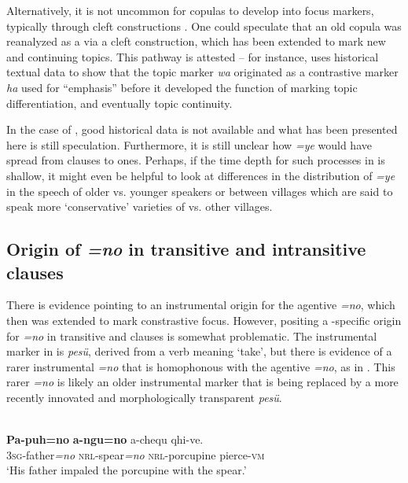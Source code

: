 \documentclass[output=paper]{LSP/langsci}
\begin{document}
Alternatively, it is not uncommon for  copulas to develop into focus markers, typically through cleft constructions  \citep[95]{Heineetal2002World}. 
One could speculate that an old   copula was reanalyzed as a  via a cleft construction, which has been extended to mark new and continuing topics. 
This pathway is attested – for instance, \citet{Ueno1987Functions} uses historical textual data to show that the  topic marker \textit{wa} originated as a contrastive marker \textit{ha} used for “emphasis” before it developed the function of marking topic differentiation, and eventually topic continuity.

In the case of , good historical data is not available and what has been presented here is still speculation. Furthermore, it is still unclear how \textit{=ye} would have spread from  clauses to  ones. Perhaps, if the time depth for such  processes in  is shallow, it might even be helpful to look at differences in the distribution of \textit{=ye} in the speech of older vs. younger speakers or between villages which are said to speak more ‘conservative’ varieties of  vs. other villages.


\subsection{Origin of \textit{=no} in transitive and intransitive clauses}\label{13-te-sec:4.3}

There is evidence pointing to an instrumental origin for the agentive \textit{=no},  which then was extended to mark constrastive focus. However, positing a -specific origin for \textit{=no} in transitive and  clauses is somewhat problematic. The instrumental marker in  is \textit{pesü}, derived from a verb meaning ‘take’, but there is evidence of a rarer instrumental \textit{=no} that is homophonous with the agentive \textit{=no}, as in . This rarer \textit{=no} is likely an older instrumental marker that is being replaced by a more recently innovated and morphologically transparent \textit{pesü}.

\ea\label{13-te-ex:39}
\\
\gll \textbf{Pa-puh=no} \textbf{a-ngu=no} a-chequ qhi-ve.\\
3\textsc{sg}-father\textit{=no} \textsc{nrl}-spear\textit{=no} \textsc{nrl}-porcupine pierce-\textsc{vm}\\
\glt ‘His father impaled the porcupine with the spear.’  %
\z
\end{document}
